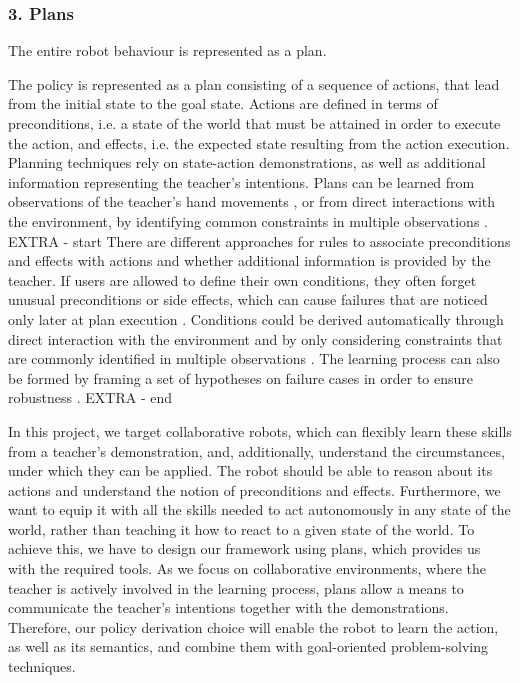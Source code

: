 \subsubsection{3. Plans}\label{sssec:Plans}
The entire robot behaviour is represented as a plan.

The policy is represented as a plan consisting of a sequence of actions, that lead from the initial state to the goal state. Actions are defined in terms of preconditions, i.e. a state of the world that must be attained in order to execute the action, and effects, i.e. the expected state resulting from the action execution. Planning techniques rely on state-action demonstrations, as well as additional information representing the teacher's intentions. 
Plans can be learned from observations of the teacher's hand movements \cite{kuniyoshi1994learning}, or from direct interactions with the environment, by identifying common constraints in multiple observations \cite{ekvall2008robot}.
EXTRA - start
There are different approaches for rules to associate preconditions and effects with actions and whether additional information is provided by the teacher. 
If users are allowed to define their own conditions, they often forget unusual preconditions or side effects, which can cause failures that are noticed only later at plan execution \cite{gil1994learning}. 
Conditions could be derived automatically through direct interaction with the environment and by only considering constraints that are commonly identified in multiple observations \cite{ekvall2008robot}.
The learning process can also be formed by framing a set of hypotheses on failure cases in order to ensure robustness \cite{yildiz2013learning}.
EXTRA - end

\noindent In this project, we target collaborative robots, which can flexibly learn these skills from a teacher's demonstration, and, additionally, understand the circumstances, under which they can be applied. The robot should be able to reason about its actions and understand the notion of preconditions and effects. Furthermore, we want to equip it with all the skills needed to act autonomously in any state of the world, rather than teaching it how to react to a given state of the world. To achieve this, we have to design our framework using plans, which provides us with the required tools. As we focus on collaborative environments, where the teacher is actively involved in the learning process, plans allow a means to communicate the teacher's intentions together with the demonstrations. Therefore, our policy derivation choice will enable the robot to learn the action, as well as its semantics, and combine them with goal-oriented problem-solving techniques.



